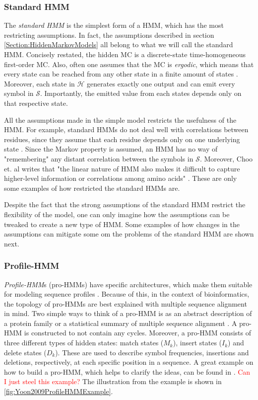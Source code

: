 \documentclass{article}
\begin{document}
\subsubsection{Standard HMM}\label{Section:StandardHMM}
The \textit{standard HMM} is the simplest form of a HMM, which has the most restricting assumptions. In fact, the assumptions described in section \ref{Section:HiddenMarkovModels} all belong to what we will call the standard HMM. Concisely restated, the hidden MC is a discrete-state time-homogeneous first-order MC. Also, often one assumes that the MC is \textit{ergodic}, which means that every state can be reached from any other state in a finite amount of states \cite{Rabiner1989}. Moreover, each state in $\mathcal{H}$ generates exactly one output and can emit every symbol in $\mathcal{S}$. Importantly, the emitted value from each states depends only on that respective state. 

All the assumptions made in the simple model restricts the usefulness of the HMM. For example, standard HMMs do not deal well with correlations between residues, since they assume that each residue depends only on one underlying state \cite{Eddy04}. Since the Markov property is assumed, an HMM has no way of "remembering" any distant correlation between the symbols in $\mathcal{S}$. Moreover, Choo et. al writes that "the linear nature of HMM also makes it difficult to capture higher-level information or correlations among amino acids" \cite{Choo2004}. These are only some examples of how restricted the standard HMMs are. 

Despite the fact that the strong assumptions of the standard HMM restrict the flexibility of the model, one can only imagine how the assumptions can be tweaked to create a new type of HMM. Some examples of how changes in the assumptions can mitigate some om the problems of the standard HMM are shown next.  

\subsubsection{Profile-HMM}
\textit{Profile-HMM}s (pro-HMMs) have specific architectures, which make them suitable for modeling sequence profiles \cite{Yoon2009}. Because of this, in the context of bioinformatics, the topology of pro-HMMs are best explained with multiple sequence alignment in mind. Two simple ways to think of a pro-HMM is as an abstract description of a protein family or a statistical summary of multiple sequence alignment \cite{Christianini2006}. A pro-HMM is constructed to not contain any cycles. Moreover, a pro-HMM consists of three different types of hidden states: match states ($M_k$), insert states ($I_k$) and delete states ($D_k$). These are used to describe symbol frequencies, insertions and deletions, respectively, at each specific position in a sequence. A great example on how to build a pro-HMM, which helps to clarify the ideas, can be found in \cite{Yoon2009}. \textcolor{red}{Can I just steel this example?} The illustration from the example is shown in \ref{fig:Yoon2009ProfileHMMExample}.
\end{document}
